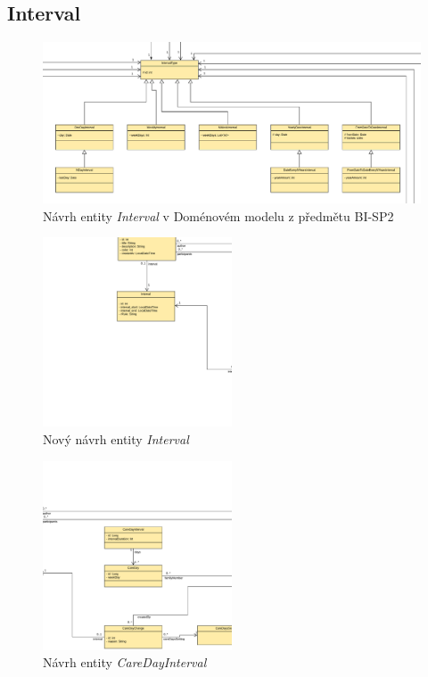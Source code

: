    \subsection{Interval}\label{narh:upravy:interval}
        \begin{figure}\centering
	        \includegraphics[width=1.0\textwidth]{pdfs/Interval1}
	        \caption[Návrh intervalu]{Návrh entity \textit{Interval} v Doménovém modelu z předmětu BI-SP2}\label{image:Interval1}
        \end{figure}
        \begin{figure}\centering
	        \includegraphics[width=0.5\textwidth]{pdfs/Interval2}
	        \caption[Návrh intervalu]{Nový návrh entity \textit{Interval}}\label{image:Interval2}
        \end{figure}
        \begin{figure}\centering
	        \includegraphics[width=0.5\textwidth]{pdfs/CareDayInterval}
	        \caption[Návrh intervalu]{Návrh entity \textit{CareDayInterval}}\label{image:careDayInterval}
        \end{figure}
